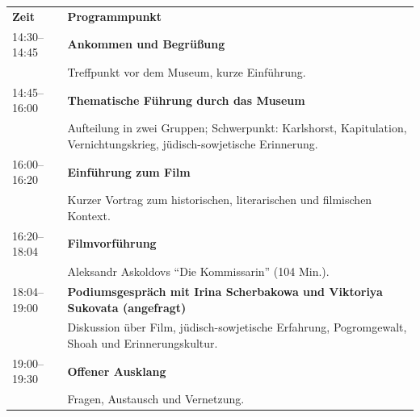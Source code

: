 \documentclass[11pt,a4paper]{article}
\begin{document}
\small
\renewcommand{\arraystretch}{1.08}
\begin{tabularx}{\textwidth}{@{}p{3.1cm}X@{}}
\textbf{Zeit} & \textbf{Programmpunkt} \\
14:30--14:45 & \textbf{Ankommen und Begr\"u{\ss}ung}\\
& Treffpunkt vor dem Museum, kurze Einf\"uhrung. \\
14:45--16:00 & \textbf{Thematische F\"uhrung durch das Museum}\\
& Aufteilung in zwei Gruppen; Schwerpunkt: Karlshorst, Kapitulation, Vernichtungskrieg, j\"udisch-sowjetische Erinnerung. \\
16:00--16:20 & \textbf{Einf\"uhrung zum Film}\\
& Kurzer Vortrag zum historischen, literarischen und filmischen Kontext. \\
16:20--18:04 & \textbf{Filmvorf\"uhrung}\\
& Aleksandr Askoldovs \enquote{Die Kommissarin} (104 Min.). \\
18:04--19:00 & \textbf{Podiumsgespr\"ach mit Irina Scherbakowa und Viktoriya Sukovata (angefragt)}\\
& Diskussion \"uber Film, j\"udisch-sowjetische Erfahrung, Pogromgewalt, Shoah und Erinnerungskultur. \\
19:00--19:30 & \textbf{Offener Ausklang}\\
& Fragen, Austausch und Vernetzung. \\
\end{tabularx}
\end{document}
